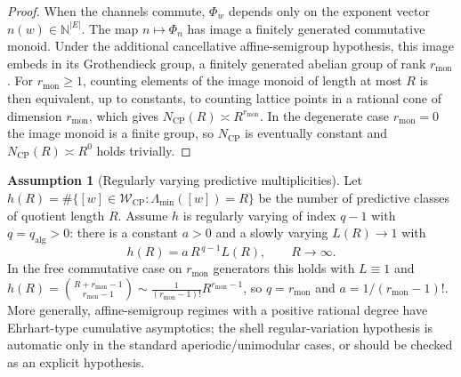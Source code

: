 \documentclass[11pt]{article}
\theoremstyle{definition}
\newtheorem{assumption}{Assumption}[section]
\theoremstyle{remark}
\newcommand{\N}{\mathbb{N}}
\newcommand{\W}{\mathcal{W}}
\newcommand{\CP}{\mathrm{CP}}
\newcommand{\qalg}{q_{\mathrm{alg}}}
\newcommand{\rmon}{r_{\mathrm{mon}}}
\newcommand{\Lam}{\Lambda}
\begin{document}
\begin{proof}
When the channels commute, $\Phi_w$ depends only on the exponent vector
$n(w)\in\N^{|E|}$.  The map $n\mapsto\Phi_n$ has image a finitely generated
commutative monoid.  Under the additional cancellative affine-semigroup
hypothesis, this image embeds in its Grothendieck group, a finitely generated
abelian group of rank $\rmon$.  For $\rmon\ge1$, counting elements of the
image monoid of length at most $R$ is then equivalent, up to constants, to
counting lattice points in a rational cone of dimension $\rmon$, which gives
$N_{\CP}(R)\asymp R^{\rmon}$.  In the degenerate case $\rmon=0$ the image
monoid is a finite group, so $N_{\CP}$ is eventually constant and
$N_{\CP}(R)\asymp R^0$ holds trivially.
\end{proof}

\begin{assumption}[Regularly varying predictive multiplicities]
\label{ass:regular-variation}
Let $h(R)=\#\{[w]\in\W_{\CP}:\Lam_{\min}([w])=R\}$ be the number of predictive
classes of quotient length $R$.  Assume $h$ is regularly varying of index
$q-1$ with $q=\qalg>0$: there is a constant $a>0$ and a slowly varying
$L(R)\to1$ with
\[
  h(R)=a\,R^{\,q-1}L(R),\qquad R\to\infty .
\]
In the free commutative case on $\rmon$ generators this holds with
$L\equiv1$ and $h(R)=\binom{R+\rmon-1}{\rmon-1}\sim
\tfrac{1}{(\rmon-1)!}R^{\rmon-1}$, so $q=\rmon$ and $a=1/(\rmon-1)!$.  More
generally, affine-semigroup regimes with a positive rational degree have
Ehrhart-type cumulative asymptotics; the shell regular-variation hypothesis is
automatic only in the standard aperiodic/unimodular cases, or should be checked
as an explicit hypothesis.
\end{assumption}
\end{document}
